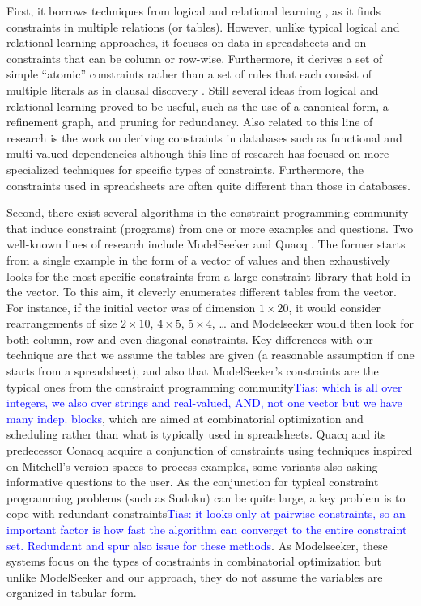 \documentclass{IEEEtran}
\newcommand{\tias}[1]{\textcolor{blue}{{\sc Tias:} #1}\xspace}
\theoremstyle{definition}
\begin{document}
First, it borrows techniques from logical and relational learning \cite{luc_book}, as it finds
constraints in multiple relations (or tables). However, unlike typical logical and relational learning
approaches, it focuses on data in spreadsheets and on constraints that can be column or row-wise.
Furthermore, it derives a set of simple “atomic” constraints rather than a set of rules that each consist of multiple literals as in clausal discovery \cite{claudien,lallouet}. Still several ideas from logical and relational learning
proved to be useful, such as the use of a canonical form, a refinement graph, and pruning for redundancy.
Also related to this line of research is the work on deriving constraints in databases such as functional and multi-valued dependencies \cite{savnik, Mannila-Raiha}
although this line of research has focused on more specialized techniques for specific types of constraints. Furthermore, the constraints used
in spreadsheets are often quite different than those in databases.


Second, there exist several algorithms in the constraint programming community that induce constraint (programs)
from one or more examples and questions. Two well-known lines of research include ModelSeeker \cite{modelseeker} and Quacq \cite{Quacq}.
The former starts from a single example in the form of a vector of values and then exhaustively looks for the most specific constraints from a large constraint library that hold in the vector. To this aim, it cleverly enumerates different tables from the vector. For instance, if the initial vector was of dimension $1 \times 20$, it would consider rearrangements of size $2 \times 10$, $4 \times 5$, $5 \times 4$, … and Modelseeker would then look for both column, row  and even diagonal constraints. Key differences with our technique are that we assume the tables are given (a reasonable assumption if one starts from a spreadsheet), and also that ModelSeeker’s constraints are the typical ones from the constraint programming community\tias{which is all over integers, we also over strings and real-valued, AND, not one vector but we have many indep. blocks}, which are aimed at combinatorial optimization and scheduling rather than what is typically used in spreadsheets. Quacq \cite{Quacq} and its predecessor Conacq \cite{Conacq} acquire a conjunction of constraints using techniques inspired on Mitchell’s version spaces to process examples, some variants also asking informative questions to the user. As the conjunction for typical constraint programming problems (such as Sudoku) can be quite large, a key problem is to cope with redundant constraints\tias{it looks only at pairwise constraints, so an important factor is how fast the algorithm can converget to the entire constraint set. Redundant and spur also issue for these methods}. As Modelseeker, these systems focus on the types of constraints in combinatorial optimization but unlike ModelSeeker and our approach, they do not assume the variables are organized in tabular form.
\end{document}
